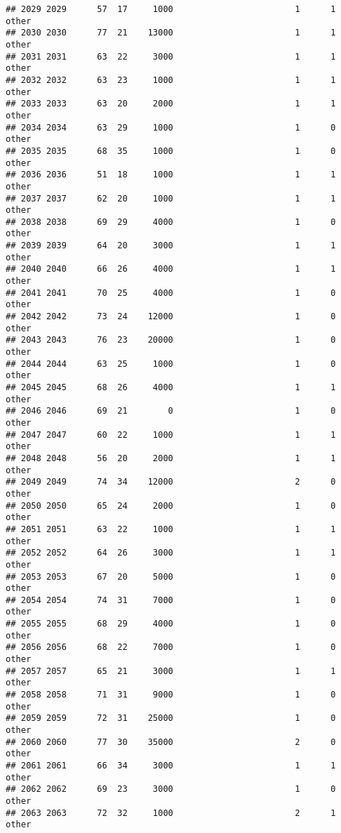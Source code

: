 \documentclass[
]{article}
\begin{document}
\begin{verbatim}
## 2029 2029      57  17     1000                        1      1    other
## 2030 2030      77  21    13000                        1      1    other
## 2031 2031      63  22     3000                        1      1    other
## 2032 2032      63  23     1000                        1      1    other
## 2033 2033      63  20     2000                        1      1    other
## 2034 2034      63  29     1000                        1      0    other
## 2035 2035      68  35     1000                        1      0    other
## 2036 2036      51  18     1000                        1      1    other
## 2037 2037      62  20     1000                        1      1    other
## 2038 2038      69  29     4000                        1      0    other
## 2039 2039      64  20     3000                        1      1    other
## 2040 2040      66  26     4000                        1      1    other
## 2041 2041      70  25     4000                        1      0    other
## 2042 2042      73  24    12000                        1      0    other
## 2043 2043      76  23    20000                        1      0    other
## 2044 2044      63  25     1000                        1      0    other
## 2045 2045      68  26     4000                        1      1    other
## 2046 2046      69  21        0                        1      0    other
## 2047 2047      60  22     1000                        1      1    other
## 2048 2048      56  20     2000                        1      1    other
## 2049 2049      74  34    12000                        2      0    other
## 2050 2050      65  24     2000                        1      0    other
## 2051 2051      63  22     1000                        1      1    other
## 2052 2052      64  26     3000                        1      1    other
## 2053 2053      67  20     5000                        1      0    other
## 2054 2054      74  31     7000                        1      0    other
## 2055 2055      68  29     4000                        1      0    other
## 2056 2056      68  22     7000                        1      0    other
## 2057 2057      65  21     3000                        1      1    other
## 2058 2058      71  31     9000                        1      0    other
## 2059 2059      72  31    25000                        1      0    other
## 2060 2060      77  30    35000                        2      0    other
## 2061 2061      66  34     3000                        1      1    other
## 2062 2062      69  23     3000                        1      0    other
## 2063 2063      72  32     1000                        2      1    other

\end{verbatim}
\end{document}
